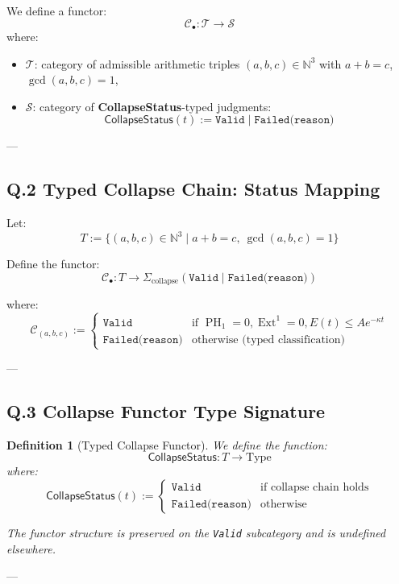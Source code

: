 \documentclass[11pt]{article}
\newtheorem{definition}[theorem]{Definition}
\DeclareMathOperator{\Ext}{Ext}
\DeclareMathOperator{\PH}{PH}
\begin{document}
We define a functor:
\[
\mathcal{C}_\bullet : \mathcal{T} \longrightarrow \mathcal{S}
\]
where:
\begin{itemize}
  \item \( \mathcal{T} \): category of admissible arithmetic triples \( (a,b,c) \in \mathbb{N}^3 \) with \( a + b = c \), \( \gcd(a,b,c) = 1 \),
  \item \( \mathcal{S} \): category of \textbf{CollapseStatus}-typed judgments:
  \[
  \mathsf{CollapseStatus}(t) := \texttt{Valid} \;|\; \texttt{Failed(reason)}
  \]
\end{itemize}

---

\subsection*{Q.2 Typed Collapse Chain: Status Mapping}

Let:
\[
T := \{ (a,b,c) \in \mathbb{N}^3 \mid a + b = c,\ \gcd(a,b,c) = 1 \}
\]

Define the functor:
\[
\mathcal{C}_\bullet : T \to \Sigma_{\text{collapse}} \left( \texttt{Valid} \mid \texttt{Failed(reason)} \right)
\]

where:
\[
\mathcal{C}_{(a,b,c)} := 
\begin{cases}
  \texttt{Valid} & \text{if } \PH_1 = 0, \Ext^1 = 0, E(t) \leq Ae^{-\kappa t} \\
  \texttt{Failed(reason)} & \text{otherwise (typed classification)}
\end{cases}
\]

---

\subsection*{Q.3 Collapse Functor Type Signature}

\begin{definition}[Typed Collapse Functor]
We define the function:
\[
\mathsf{CollapseStatus} : T \to \mathrm{Type}
\]
where:
\[
\mathsf{CollapseStatus}(t) := 
\begin{cases}
  \texttt{Valid} & \text{if collapse chain holds} \\
  \texttt{Failed(reason)} & \text{otherwise}
\end{cases}
\]

The functor structure is preserved on the \texttt{Valid} subcategory and is undefined elsewhere.
\end{definition}

---
\end{document}
